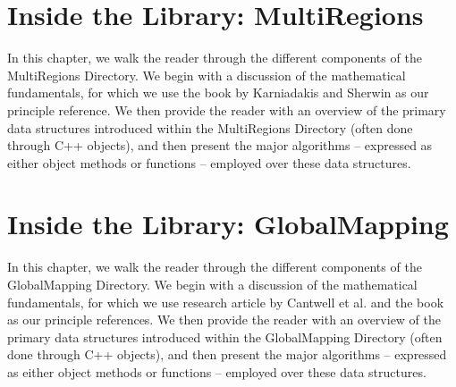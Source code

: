 
%

%



\chapter{Inside the Library: MultiRegions}
\label{chap:multiregions}


In this chapter, we walk the reader through the different components
of the MultiRegions Directory.  We begin with a discussion of the
mathematical fundamentals, for which we use the book by Karniadakis
and Sherwin \cite{KaSh05} as our principle reference.  We then provide
the reader with an overview of the primary data structures introduced
within the MultiRegions Directory (often done through C++ objects),
and then present the major algorithms -- expressed as either object
methods or functions -- employed over these data structures.


%

%

%




\chapter{Inside the Library: GlobalMapping}
\label{chapter:globalmapping} 

In this chapter, we walk the reader through the different components
of the GlobalMapping Directory.  We begin with a discussion of the
mathematical fundamentals, for which we use research article by
Cantwell et al. \cite{CantwellYKPS14} and the book \cite{Ar89} as our
principle references.  We then provide the reader with an overview of
the primary data structures introduced within the GlobalMapping
Directory (often done through C++ objects), and then present the major
algorithms -- expressed as either object methods or functions --
employed over these data structures.


%

%




